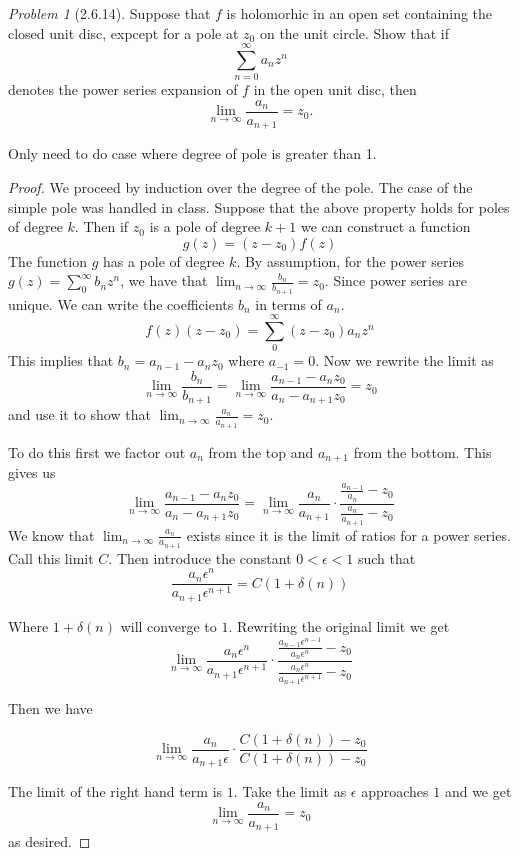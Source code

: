 \documentclass[10pt]{article}
\theoremstyle{remark}
\newtheorem{problem}{Problem}
\theoremstyle{remark}
\begin{document}
\begin{problem}[2.6.14]
  Suppose that $f$ is holomorhic in an open set containing the closed unit disc,
  expcept for a pole at $z_0$ on the unit circle. Show that if
  \[
    \sum_{n=0}^\infty a_n z^n
  \]
  denotes the power series expansion of $f$ in the open unit disc, then
  \[
    \lim_{n\rightarrow\infty}\frac{a_n}{a_{n+1}}=z_0.
  \]
  
  Only need to do case where degree of pole is greater than 1.
\end{problem}

\begin{proof}
  We proceed by induction over the degree of the pole. The case of the simple
  pole was handled in class. Suppose that the above property holds for poles of
  degree $k$. Then if $z_0$ is a pole of degree $k+1$ we can construct a function
  \[
    g(z)=(z-z_0)f(z)
  \]
  The function $g$ has a pole of degree $k$. By assumption, for the power series
  $g(z)=\sum_0^\infty b_nz^n$, we have that $\lim_{n\rightarrow\infty}\frac{b_n}{b_{n+1}}=z_0$. Since
  power series are unique. We can write the coefficients $b_n$ in terms of $a_n$.
  \[
    f(z)(z-z_0)=\sum_0^\infty(z-z_0)a_nz^n
  \]
  This implies that $b_n=a_{n-1}-a_nz_0$ where $a_{-1}=0$. Now we rewrite the limit
  as
  \[
    \lim_{n\rightarrow\infty}\frac{b_n}{b_{n+1}}=\lim_{n\rightarrow\infty}\frac{a_{n-1}-a_nz_0}{a_n-a_{n+1}z_0}=z_0
  \]
  and use it to show that $\lim_{n\rightarrow\infty}\frac{a_n}{a_{n+1}}=z_0$.

  To do this first we factor out $a_n$ from the top and $a_{n+1}$ from the bottom. This
  gives us
  \[
    \lim_{n\rightarrow\infty}\frac{a_{n-1}-a_nz_0}{a_n-a_{n+1}z_0}=\lim_{n\rightarrow\infty}\frac{a_n}{a_{n+1}}\cdot\frac{\frac{a_{n-1}}{a_n}-z_0}{\frac{a_n}{a_{n+1}}-z_0}
  \]
  We know that $\lim_{n\rightarrow\infty}\frac{a_n}{a_{n+1}}$ exists since it is
  the limit of ratios for a power series. Call this limit $C$. Then introduce the constant $0<\epsilon<1$
  such that
  \[
    \frac{a_n\epsilon^n}{a_{n+1}\epsilon^{n+1}}=C(1+\delta(n))
  \]

  Where $1+\delta(n)$ will converge to $1$. Rewriting the original limit we get
  \[
    \lim_{n\rightarrow\infty}\frac{a_n\epsilon^n}{a_{n+1}\epsilon^{n+1}}\cdot\frac{\frac{a_{n-1}\epsilon^{n-1}}{a_n\epsilon^{n}}-z_0}{\frac{a_n\epsilon^{n}}{a_{n+1}\epsilon^{n+1}}-z_0}
  \]

  Then we have

  \[
    \lim_{n\rightarrow\infty}\frac{a_n}{a_{n+1}\epsilon}\cdot\frac{C(1+\delta(n))-z_0}{C(1+\delta(n))-z_0}
  \]

  The limit of the right hand term is $1$. Take the limit as $\epsilon$ approaches $1$ and we
  get
  \[
    \lim_{n\rightarrow\infty}\frac{a_n}{a_{n+1}}=z_0
  \]
  as desired.
\end{proof}
\end{document}
